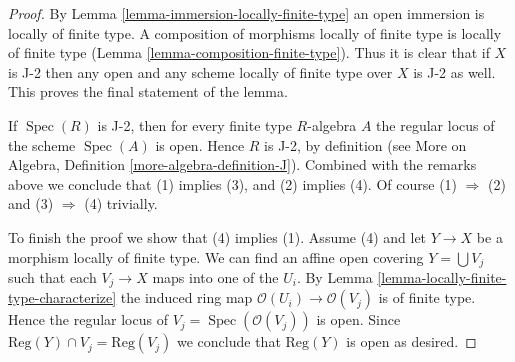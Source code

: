 \documentclass[10pt,a4paper]{amsart}
\theoremstyle{plain}
\theoremstyle{definition}
\theoremstyle{remark}
\numberwithin{equation}{subsection}
\def\Spec{\mathop{\mathrm{Spec}}}
\begin{document}
\begin{proof}
By Lemma \ref{lemma-immersion-locally-finite-type} an open immersion
is locally of finite type. A composition of morphisms locally of
finite type is locally of finite type
(Lemma \ref{lemma-composition-finite-type}). Thus it is clear that if $X$ is
J-2 then any open and any scheme locally of finite
type over $X$ is J-2 as well. This proves the final
statement of the lemma.

\medskip\noindent
If $\Spec(R)$ is J-2, then for every finite type $R$-algebra $A$
the regular locus of the scheme $\Spec(A)$ is open. Hence $R$ is
J-2, by definition (see
More on Algebra, Definition \ref{more-algebra-definition-J}).
Combined with the remarks above we conclude that (1) implies (3), and
(2) implies (4). Of course (1) $\Rightarrow$ (2) and
(3) $\Rightarrow$ (4) trivially.

\medskip\noindent
To finish the proof we show that (4) implies (1).
Assume (4) and let $Y \to X$ be a morphism locally of finite type.
We can find an affine open covering $Y = \bigcup V_j$ such that
each $V_j \to X$ maps into one of the $U_i$. By
Lemma \ref{lemma-locally-finite-type-characterize}
the induced ring map $\mathcal{O}(U_i) \to \mathcal{O}(V_j)$ is
of finite type. Hence the regular locus of
$V_j = \Spec(\mathcal{O}(V_j))$ is open. Since
$\text{Reg}(Y) \cap V_j = \text{Reg}(V_j)$ we conclude that
$\text{Reg}(Y)$ is open as desired.
\end{proof}
\end{document}

